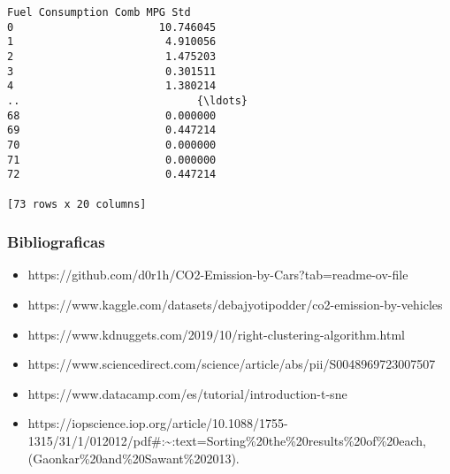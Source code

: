 \documentclass[11pt]{article}
\providecommand{\tightlist}{%
      \setlength{\itemsep}{0pt}\setlength{\parskip}{0pt}}
\begin{document}
\begin{tcolorbox}[breakable, size=fbox, boxrule=.5pt, pad at break*=1mm, opacityfill=0]
\begin{Verbatim}[commandchars=\\\{\}]
    Fuel Consumption Comb MPG Std
0                       10.746045
1                        4.910056
2                        1.475203
3                        0.301511
4                        1.380214
..                            {\ldots}
68                       0.000000
69                       0.447214
70                       0.000000
71                       0.000000
72                       0.447214

[73 rows x 20 columns]
\end{Verbatim}
\end{tcolorbox}
        
    \subsubsection{\texorpdfstring{\textbf{Bibliograficas}}{Bibliograficas}}\label{bibliograficas}

\begin{itemize}
\tightlist
\item
  https://github.com/d0r1h/CO2-Emission-by-Cars?tab=readme-ov-file
\item
  https://www.kaggle.com/datasets/debajyotipodder/co2-emission-by-vehicles
\item
  https://www.kdnuggets.com/2019/10/right-clustering-algorithm.html
\item
  https://www.sciencedirect.com/science/article/abs/pii/S0048969723007507
\item
  https://www.datacamp.com/es/tutorial/introduction-t-sne
\item
  https://iopscience.iop.org/article/10.1088/1755-1315/31/1/012012/pdf\#:\textasciitilde:text=Sorting\%20the\%20results\%20of\%20each,(Gaonkar\%20and\%20Sawant\%202013).
\end{itemize}


    
    
    
\end{document}
